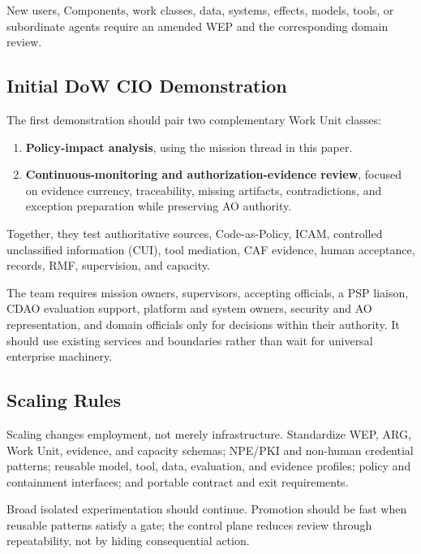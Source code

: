 \documentclass[11pt]{article}
\begin{document}
New users, Components, work classes, data, systems, effects, models,
tools, or subordinate agents require an amended WEP and the
corresponding domain review.

\hypertarget{101-initial-dow-cio-demonstration}{%
\subsection{Initial DoW CIO
Demonstration}\label{101-initial-dow-cio-demonstration}}

The first demonstration should pair two complementary Work Unit classes:

\begin{enumerate}
\def\labelenumi{\arabic{enumi}.}
\tightlist
\item
  \textbf{Policy-impact analysis}, using the mission thread in this
  paper.
\item
  \textbf{Continuous-monitoring and authorization-evidence review},
  focused on evidence currency, traceability, missing artifacts,
  contradictions, and exception preparation while preserving AO
  authority.
\end{enumerate}

Together, they test authoritative sources, Code-as-Policy, ICAM,
controlled unclassified information (CUI), tool mediation, CAF evidence,
human acceptance, records, RMF, supervision, and capacity.

The team requires mission owners, supervisors, accepting officials, a
PSP liaison, CDAO evaluation support, platform and system owners,
security and AO representation, and domain officials only for decisions
within their authority. It should use existing services and boundaries
rather than wait for universal enterprise machinery.

\hypertarget{102-scaling-rules}{%
\subsection{Scaling Rules}\label{102-scaling-rules}}

Scaling changes employment, not merely infrastructure. Standardize WEP,
ARG, Work Unit, evidence, and capacity schemas; NPE/PKI and non-human
credential patterns; reusable model, tool, data, evaluation, and
evidence profiles; policy and containment interfaces; and portable
contract and exit requirements.

Broad isolated experimentation should continue. Promotion should be fast
when reusable patterns satisfy a gate; the control plane reduces review
through repeatability, not by hiding consequential action.
\end{document}
